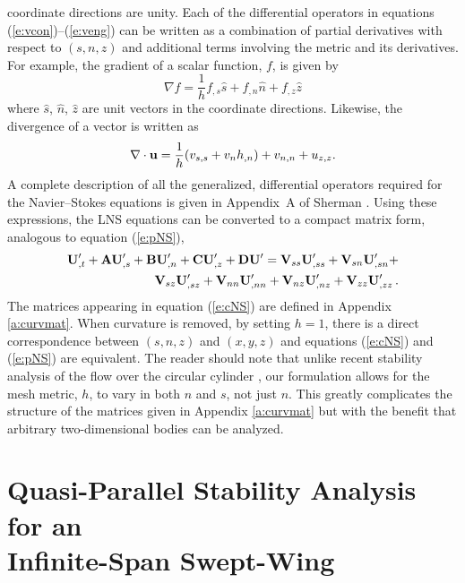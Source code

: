 coordinate directions are unity.  Each of the differential operators in
equations (\ref{e:vcon})--(\ref{e:veng}) can be written as a combination of
partial derivatives with respect to $(s,n,z)$ and additional terms involving
the metric and its derivatives.  For example, the gradient of a scalar
function, $f$, is given by
%
\begin{equation}
  \nabla f = \frac{1}{h} f_{,s} \hat s + f_{,n} \hat n + f_{,z} \hat z
\end{equation}
%
where $\hat s$, $\hat n$, $\hat z$ are unit vectors in the coordinate
directions.  Likewise, the divergence of a vector is written as
%
\begin{equation}
  \nabla \cdot {\bf u} = \frac{1}{h} ( v_{s,s} + v_n h_{,n} ) + v_{n,n} + u_{z,z} .
\end{equation}
%
A complete description of all the generalized, differential operators required
for the Navier--Stokes equations is given in Appendix~A of Sherman
\cite{Sherman:90}.  Using these expressions, the LNS equations can be converted
to a compact matrix form, analogous to equation (\ref{e:pNS}),
%
\begin{eqnarray} \label{e:cNS}
  {\bf U}'_{,t} + {\bf A} {\bf U}'_{,s} + {\bf B} {\bf U}'_{,n} + {\bf C} {\bf U}'_{,z} + {\bf D} {\bf U}' =
  {{\bf V}_{ss}} {\bf U}'_{,ss} + {{\bf V}_{sn}} {\bf U}'_{,sn} + \nonumber \\
  {{\bf V}_{sz}} {\bf U}'_{,sz} + {{\bf V}_{nn}} {\bf U}'_{,nn} + {{\bf V}_{nz}} {\bf U}'_{,nz} + 
  {\bf V}_{zz} {\bf U}'_{,zz}
  {\, .} 
\end{eqnarray}
%
The matrices appearing in equation (\ref{e:cNS}) are defined in Appendix
\ref{a:curvmat}.  When curvature is removed, by setting $h=1$, there is a
direct correspondence between $(s,n,z)$ and $(x,y,z)$ and equations
(\ref{e:cNS}) and (\ref{e:pNS}) are equivalent.  The reader should note that
unlike recent stability analysis of the flow over the circular cylinder
\cite{MaMa:94}, our formulation allows for the mesh metric, $h$, to vary in
both $n$ and $s$, not just $n$.  This greatly complicates the structure of the
matrices given in Appendix \ref{a:curvmat} but with the benefit that arbitrary
two-dimensional bodies can be analyzed.

\section[Quasi-Parallel Stability Analysis for an Infinite-Span 
Swept-Wing] {Quasi-Parallel Stability Analysis for an \protect \\
Infinite-Span Swept-Wing \label{s:QPLST} }


